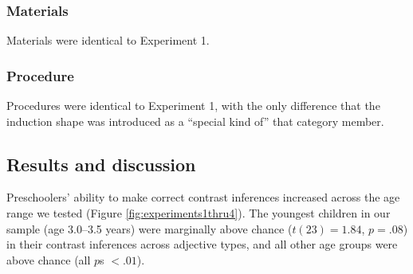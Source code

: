 \documentclass[man]{apa2}
\begin{document}
\subsubsection{Materials}

Materials were identical to Experiment 1.

\subsubsection{Procedure}

Procedures were identical to Experiment 1, with the only difference that the induction shape was introduced as a ``special kind of'' that category member.

\subsection{Results and discussion}


Preschoolers' ability to make correct contrast inferences increased across the age range we tested (Figure \ref{fig:experiments1thru4}).%
The youngest children in our sample (age 3.0--3.5 years) were marginally above chance ($t(23) = 1.84$, $p = .08$) in their contrast inferences across adjective types, and all other age groups were above chance (all $p$s $< .01$).


\end{document}
